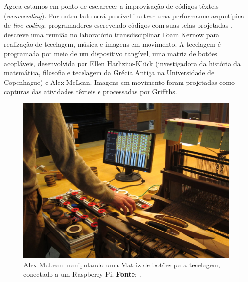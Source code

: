 Agora estamos em ponto de esclarecer a improvisação de códigos têxteis (\emph{weavecoding}). Por outro lado será possível ilustrar uma performance arquetípica de \emph{live coding}: programadores escrevendo códigos com suas telas projetadas \cite[p.~129]{McLean2011}.  descreve uma reunião no laboratório transdisciplinar Foam Kernow para realização de tecelagem, música e imagens em movimento. A tecelagem é programada por meio de um dispositivo tangível, uma matriz de botões acopláveis, desenvolvida por Ellen Harlizius-Klück (investigadora da história da matemática, filosofia e tecelagem da Grécia Antiga na Universidade de Copenhague) e Alex McLean. Imagens em movimento foram projetadas como capturas das atividades têxteis e processadas por Griffths. 

\begin{figure}[!h]
  \centering
  \includegraphics[scale=0.95]{imagens/wavecoding.jpg}
  \caption{ Alex McLean manipulando uma Matriz de botões para tecelagem, conectado a um Raspberry Pi. \textbf{Fonte}: .}
  \label{fig:wavecoding}
\end{figure}

